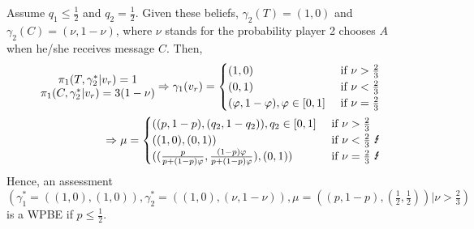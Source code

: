 \documentclass[]{article}
\begin{document}
Assume $q_1 \leq \frac{1}{2}$ and $q_2 = \frac{1}{2}$. Given these beliefs, $\gamma_2(T) = (1, 0)$ and $\gamma_2(C) = (\nu, 1 - \nu)$, where $\nu$ stands for the probability player 2 chooses $A$ when he/she receives message $C$. Then,
\begin{equation}
	\begin{split}
		\begin{matrix}
			\pi_1(T, \gamma_2^*|v_r) = 1 \\ \nonumber
			\pi_1(C, \gamma_2^*|v_r) = 3(1 - \nu)
		\end{matrix} \Rightarrow \gamma_1(v_r) = \begin{cases}
			(1, 0) & \text{ if } \nu > \frac{2}{3} \\
			(0, 1) & \text{ if } \nu < \frac{2}{3} \\
			(\varphi, 1 - \varphi), \varphi\in[0, 1] & \text{ if } \nu = \frac{2}{3}
		\end{cases} \\
		\Rightarrow \mu = \begin{cases}
			((p, 1 - p), (q_2, 1 - q_2)), q_2\in [0, 1] &\text{ if } \nu > \frac{2}{3}\\
			((1, 0), (0, 1)) &\text{ if } \nu < \frac{2}{3}\text{ \Lightning}\\
			((\frac{p}{p + (1 - p)\varphi}, \frac{(1 - p)\varphi}{p + (1 - p)\varphi}), (0, 1)) &\text{ if } \nu = \frac{2}{3}\text{ \Lightning}\\
		\end{cases}
	\end{split}
\end{equation}
Hence, an assessment $(\gamma_1^* = ((1, 0), (1, 0)), \gamma_2^* = ((1, 0), (\nu, 1 - \nu)), \mu = ((p, 1 - p), (\frac{1}{2}, \frac{1}{2}))| \nu > \frac{2}{3})$ is a WPBE if $p \leq \frac{1}{2}$.
\end{document}
